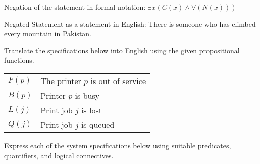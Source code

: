 \documentclass[addpoints]{exam}
\begin{document}
\begin{questions}
\begin{parts}
\begin{solution}
      Negation of the statement in formal notation:
      \newline $\exists x (C(x) \land \forall (N(x)))$

      Negated Statement as a statement in English:
      \newline There is someone who has climbed every mountain in Pakistan.

    \end{solution}
  \end{parts}

\question
  Translate the specifications below into English using the given propositional functions.\\
  \begin{tabular}{l@{ : }l}
    $F(p)$ & The printer $p$ is out of service\\
    $B(p)$ & Printer $p$ is busy\\
    $L(j)$ & Print job $j$ is lost\\
    $Q(j)$ & Print job $j$ is queued
  \end{tabular}

\question Express each of the system specifications below using suitable predicates, quantifiers, and logical connectives.
\end{questions}
\end{document}
